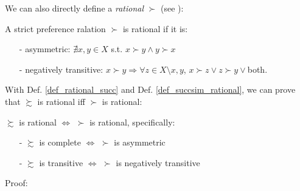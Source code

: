 We can also directly define a \textit{rational} $\succ$ (see \citet[Page 19-21]{kreps1990acourse}):
\begin{definition}\label{def_rational_succ}
    A strict preference ralation $\succ$ is rational if it is:
    \begin{enumerate}
        \item[-] asymmetric: $\nexists x,y\in X$ s.t. $x\succ y \land y\succ x$
        \item[-] negatively transitive: $x\succ y \Rightarrow \forall z\in X\setminus{x,y}$, $x\succ z\lor z\succ y \lor$both. 
    \end{enumerate}
\end{definition}

With Def. \ref{def_rational_succ} and Def. \ref{def_succsim_rational}, we can prove that $\succsim$ is rational iff $\succ$ is rational:
\begin{theorem}
    $\succsim$ is rational $\Leftrightarrow$ $\succ$ is rational, specifically:
    \begin{enumerate}
        \item[-] $\succsim$ is complete $\Leftrightarrow$ $\succ$ is asymmetric
        \item[-] $\succsim$ is transitive $\Leftrightarrow$ $\succ$ is negatively transitive
    \end{enumerate}
\end{theorem}

Proof: